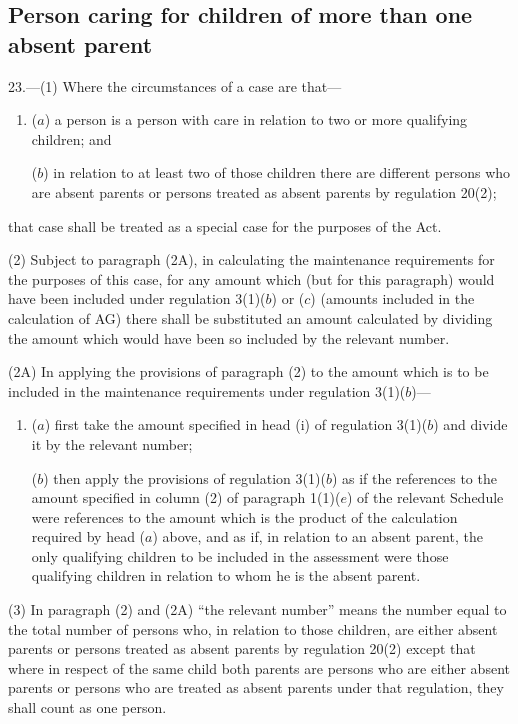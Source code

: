 \documentclass[a4paper]{article}
\begin{document}
\subsection[23. Person caring for children of more than one absent parent]{Person caring for children of more than one absent parent}

23.—(1) Where the circumstances of a case are that—
\begin{enumerate}\item[]
($a$) a person is a person with care in relation to two or more qualifying children; and

($b$) in relation to at least two of those children there are different persons who are absent parents or persons treated as absent parents by regulation 20(2);
\end{enumerate}
that case shall be treated as a special case for the purposes of the Act.

(2) 
Subject to paragraph (2A), %
in calculating the maintenance requirements for the purposes of this case, for any amount which (but for this paragraph) would have been included under regulation 3(1)($b$)
or ($c$)  %
(amounts included in the calculation of AG) there shall be substituted an amount calculated by dividing the amount which would have been so included by the relevant number.

(2A) In applying the provisions of paragraph (2) to the amount which is to be included in the maintenance requirements under regulation 3(1)($b$)—
\begin{enumerate}\item[]
($a$) first take the amount specified in head (i) of regulation 3(1)($b$) and divide it by the relevant number;

($b$) then apply the provisions of regulation 3(1)($b$) as if the references to the amount specified in column (2) of paragraph 1(1)($e$) of the relevant Schedule were references to the amount which is the product of the calculation required by head ($a$) above, and as if, in relation to an absent parent, the only qualifying children to be included in the assessment were those qualifying children in relation to whom he is the absent parent.
\end{enumerate}

(3) 
In paragraph (2) and (2A) %
“the relevant number” means the number equal to the total number of persons who, in relation to those children, are either absent parents or persons treated as absent parents by regulation 20(2) except that where in respect of the same child both parents are persons who are either absent parents or persons who are treated as absent parents under that regulation, they shall count as one person.
\end{document}
